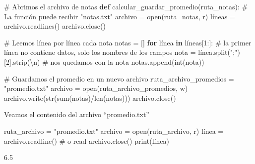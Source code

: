 \documentclass[
  letterpaper,
  DIV=11,
  numbers=noendperiod]{scrreprt}
\newenvironment{Shaded}{\begin{snugshade}}{\end{snugshade}}
\newcommand{\BuiltInTok}[1]{\textcolor[rgb]{0.00,0.23,0.31}{#1}}
\newcommand{\CharTok}[1]{\textcolor[rgb]{0.13,0.47,0.30}{#1}}
\newcommand{\CommentTok}[1]{\textcolor[rgb]{0.37,0.37,0.37}{#1}}
\newcommand{\ControlFlowTok}[1]{\textcolor[rgb]{0.00,0.23,0.31}{\textbf{#1}}}
\newcommand{\DecValTok}[1]{\textcolor[rgb]{0.68,0.00,0.00}{#1}}
\newcommand{\ExtensionTok}[1]{\textcolor[rgb]{0.00,0.23,0.31}{#1}}
\newcommand{\KeywordTok}[1]{\textcolor[rgb]{0.00,0.23,0.31}{\textbf{#1}}}
\newcommand{\NormalTok}[1]{\textcolor[rgb]{0.00,0.23,0.31}{#1}}
\newcommand{\OperatorTok}[1]{\textcolor[rgb]{0.37,0.37,0.37}{#1}}
\newcommand{\StringTok}[1]{\textcolor[rgb]{0.13,0.47,0.30}{#1}}
\begin{document}
\begin{Shaded}
\begin{Highlighting}[]
\CommentTok{\# Abrimos el archivo de notas}
\KeywordTok{def}\NormalTok{ calcular\_guardar\_promedio(ruta\_notas): }\CommentTok{\# La función puede recibir "notas.txt"}
\NormalTok{  archivo }\OperatorTok{=} \BuiltInTok{open}\NormalTok{(ruta\_notas, }\StringTok{\textquotesingle{}r\textquotesingle{}}\NormalTok{)}
\NormalTok{  líneas }\OperatorTok{=}\NormalTok{ archivo.readlines()}
\NormalTok{  archivo.close()}

  \CommentTok{\# Leemos línea por línea cada nota }
\NormalTok{  notas }\OperatorTok{=}\NormalTok{ []}
  \ControlFlowTok{for}\NormalTok{ línea }\KeywordTok{in}\NormalTok{ líneas[}\DecValTok{1}\NormalTok{:]: }\CommentTok{\# la primer línea no contiene datos, solo los nombres de los campos}
\NormalTok{    nota }\OperatorTok{=}\NormalTok{ línea.split(}\StringTok{";"}\NormalTok{)[}\DecValTok{2}\NormalTok{].strip(}\StringTok{\textquotesingle{}}\CharTok{\textbackslash{}n}\StringTok{\textquotesingle{}}\NormalTok{) }\CommentTok{\# nos quedamos con la nota}
\NormalTok{    notas.append(}\BuiltInTok{int}\NormalTok{(nota))}

  \CommentTok{\# Guardamos el promedio en un nuevo archivo}
\NormalTok{  ruta\_archivo\_promedios }\OperatorTok{=} \StringTok{"promedio.txt"}
\NormalTok{  archivo }\OperatorTok{=} \BuiltInTok{open}\NormalTok{(ruta\_archivo\_promedios, }\StringTok{\textquotesingle{}w\textquotesingle{}}\NormalTok{)}
\NormalTok{  archivo.write(}\BuiltInTok{str}\NormalTok{(}\BuiltInTok{sum}\NormalTok{(notas)}\OperatorTok{/}\BuiltInTok{len}\NormalTok{(notas)))}
\NormalTok{  archivo.close()}
\end{Highlighting}
\end{Shaded}

Veamos el contenido del archivo ``promedio.txt''

\begin{Shaded}
\begin{Highlighting}[]
\NormalTok{ruta\_archivo }\OperatorTok{=} \StringTok{"promedio.txt"}
\NormalTok{archivo }\OperatorTok{=} \BuiltInTok{open}\NormalTok{(ruta\_archivo, }\StringTok{\textquotesingle{}r\textquotesingle{}}\NormalTok{)}
\NormalTok{línea }\OperatorTok{=}\NormalTok{ archivo.readline() }\CommentTok{\# o read}
\NormalTok{archivo.close()}
\BuiltInTok{print}\NormalTok{(línea)}
\end{Highlighting}
\end{Shaded}

\begin{Shaded}
\begin{Highlighting}[]
\ExtensionTok{6.5}
\end{Highlighting}
\end{Shaded}
\end{document}
